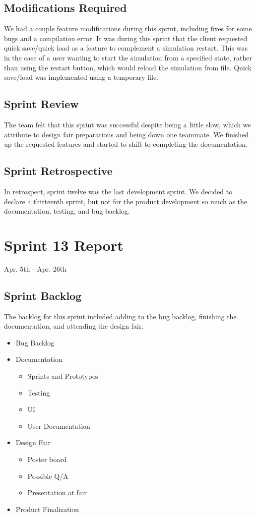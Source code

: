 \subsection{Modifications Required}
We had a couple feature modifications during this sprint, including fixes for some bugs and a compilation error. It was during this sprint that the client requested quick save/quick load as a feature to complement a simulation restart. This was in the case of a user wanting to start the simulation from a specified state, rather than using the restart button, which would reload the simulation from file. Quick save/load was implemented using a temporary file.

\subsection{Sprint Review}
The team felt that this sprint was successful despite being a little slow, which we attribute to design fair preparations and being down one teammate. We finished up the requested features and started to shift to completing the documentation.

\subsection{Sprint Retrospective}

In retrospect, sprint twelve was the last development sprint. We decided to declare a thirteenth sprint, but not for the product development so much as the documentation, testing, and bug backlog. 

\section{Sprint 13 Report}
Apr. 5th - Apr. 26th
\subsection{Sprint Backlog}

The backlog for this sprint included adding to the bug backlog, finishing the documentation, and attending the design fair.

\begin{itemize}
	\item Bug Backlog
	\item Documentation		
	\begin{itemize}
		\item Sprints and Prototypes
		\item Testing
		\item UI
		\item User Documentation
	\end{itemize}
	\item Design Fair	
	\begin{itemize}
    	\item Poster board
    	\item Possible Q/A
    	\item Presentation at fair
	\end{itemize}
	\item Product Finalization
\end{itemize}

